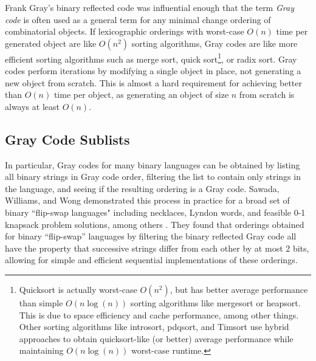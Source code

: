 Frank Gray's binary reflected code was influential enough that the term \emph{Gray code} is often used as a general term for any minimal change ordering of combinatorial objects.  If lexicographic orderings with worst-case $O(n)$ time per generated object are like $O(n^2)$ sorting algorithms, Gray codes are like more efficient sorting algorithms such as merge sort, quick sort\footnote{Quicksort is actually worst-case $O(n^2)$, but has better average performance than simple $O(n \log(n))$ sorting algorithms like mergesort or heapsort.  This is due to space efficiency and cache performance, among other things.  Other sorting algorithms like introsort, pdqsort, and Timsort use hybrid approaches to obtain quicksort-like (or better) average performance while maintaining $O(n \log(n))$ worst-case runtime.}, or radix sort.  Gray codes perform iterations by modifying a single object in place, not generating a new object from scratch.  This is almost a hard requirement for achieving better than $O(n)$ time per object, as generating an object of size $n$ from scratch is always at least $O(n)$.


\subsection{Gray Code Sublists} \label{sec:GraySublists}
In particular, Gray codes for many binary languages can be obtained by listing all binary strings in Gray code order, filtering the list to contain only strings in the language, and seeing if the resulting ordering is a Gray code.  Sawada, Williams, and Wong demonstrated this process in practice for a broad set of binary ``flip-swap languages" including necklaces, Lyndon words, and feasible 0-1 knapsack problem solutions, among others \cite{sawada2021inside}.  They found that orderings obtained for binary ``flip-swap'' languages by filtering the binary reflected Gray code all have the property that successive strings differ from each other by at most 2 bits, allowing for simple and efficient sequential implementations of these orderings.


